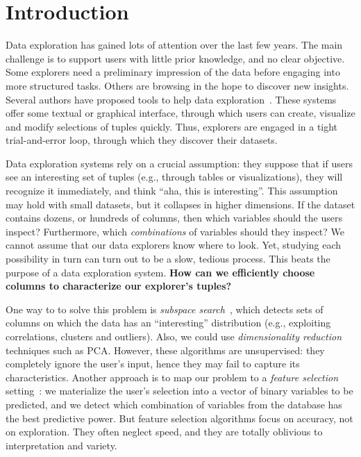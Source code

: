 \section{Introduction}
\label{sec:introdction}
Data exploration has gained lots of attention over the last few years. The
main challenge is to support users with little prior knowledge, and no clear
objective. Some explo\-rers need a preliminary impression of the data before
engaging into more structured tasks. Others are browsing in the hope to
discover new insights. Several authors have proposed tools to help data
exploration~\cite{abouzied2012dataplay, dimitriadou2014explore,
liarou2014dbtouch, sellam2013meet}. These systems offer some textual or
graphical interface, through which users can create, visualize and modify
selections of tuples quickly. Thus, explorers are engaged in a tight
trial-and-error loop, through which they discover their datasets. 

Data exploration systems rely on a crucial assumption: they suppose that if 
users see an interesting set of tuples (e.g., through tables or
visualizations), they will recognize it immediately, and think ``aha, this is
interesting''. This assumption may hold with small datasets, but it collapses
in higher dimensions. If the dataset contains  dozens, or hundreds of columns,
then which variables should the users inspect? Furthermore, which
\emph{combinations} of variables should they inspect? We cannot assume that
our data explorers know where to look.  Yet, studying each possibility in turn
can turn out to be a slow, tedious process. This beats the purpose of a data
exploration system.
\textbf{How can we efficiently choose columns to characterize  our explorer's
tuples?}

One way to to solve this problem is \emph{subspace search}~\cite{Agrawal1998,
nguyen20134s}, which detects sets of columns on which the data has an
``interesting'' distribution (e.g., exploiting correlations, clusters and
outliers). Also, we could use \emph{dimensiona\-lity reduction} techniques such
as PCA. However, these algorithms are unsupervised: they completely ignore the
user's input, hence they may fail to capture its characteristics. Another
approach is to map our problem to a \emph{feature selection}
setting~\cite{guyon2003introduction}: we materialize the user's selection into
a vector of binary variables to be predicted, and we detect which combination of variables from the
database has the best predictive power. But feature selection algorithms focus
on accuracy, not on exploration. They often neglect speed, and they are totally
oblivious to interpretation and variety.

